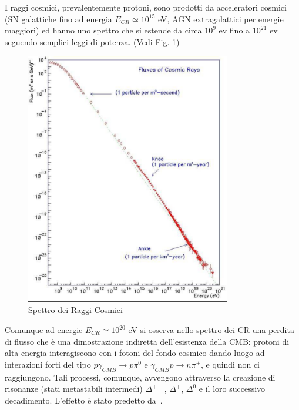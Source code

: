 I raggi cosmici, prevalentemente protoni, sono prodotti da acceleratori cosmici
(SN galattiche fino ad energia $E_{CR} \simeq 10^{15}$ eV, AGN extragalattici
per energie maggiori) ed hanno uno spettro che si estende da circa $10^9$ ev fino a $10^{21}$ ev
seguendo semplici leggi di potenza. (Vedi Fig. \ref{fig:CR1})
 \begin{figure}
   \centering{}
   \includegraphics[width=0.8\textwidth]{figure/CR_spectrum_1.pdf}
  \caption{Spettro dei Raggi Cosmici}
  \label{fig:CR1}
\end{figure}
Comunque ad energie $E_{CR} \simeq 10^{20}$ eV si osserva nello spettro dei CR
una perdita di flusso che è una dimostrazione indiretta dell'esistenza della
CMB: protoni di alta energia interagiscono con i fotoni del fondo cosmico dando
luogo ad interazioni forti del tipo $p \gamma_{CMB} \to p \pi^0$ e $\gamma_{CMB}
p \to n \pi^+$, e quindi non ci raggiungono.  Tali processi, comunque, avvengono
attraverso la creazione di risonanze (stati metastabili intermedi)
$\Delta^{++}$, $\Delta^{+}$, $\Delta^{0}$ e il loro successivo decadimento.
L'effetto è stato predetto
da~\textcites{1966PhRvL..16..748G}{1966JETPL...4...78Z}.

